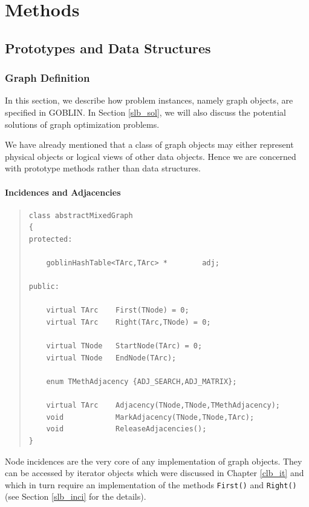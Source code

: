 \documentclass[a4paper,11pt,twoside]{book}
\begin{document}
\part{Methods}
\thispagestyle{empty}
\begin{multicols}{2}

\chapter{Prototypes and Data Structures}
\thispagestyle{fancy}
\label{clb_proto}

\section{Graph Definition}
\label{slb_definition}
In this section, we describe how problem instances, namely graph objects,
are specified in GOBLIN. In Section \ref{slb_sol}, we will also discuss the
potential solutions of graph optimization problems.

We have already mentioned that a class of graph objects may either represent
physical objects or logical views of other data objects. Hence we are concerned
with prototype methods rather than data structures.


\subsection{Incidences and Adjacencies}
\methods
\begin{quote}
\begin{verbatim}
class abstractMixedGraph
{
protected:

    goblinHashTable<TArc,TArc> *        adj;

public:

    virtual TArc    First(TNode) = 0;
    virtual TArc    Right(TArc,TNode) = 0;

    virtual TNode   StartNode(TArc) = 0;
    virtual TNode   EndNode(TArc);

    enum TMethAdjacency {ADJ_SEARCH,ADJ_MATRIX};

    virtual TArc    Adjacency(TNode,TNode,TMethAdjacency);
    void            MarkAdjacency(TNode,TNode,TArc);
    void            ReleaseAdjacencies();
}
\end{verbatim}
\end{quote}
Node incidences are the very core of any implementation of graph objects.
They can be accessed by iterator objects which were discussed in Chapter
\ref{clb_it} and which in turn require an implementation of the methods
\verb/First()/ and \verb/Right()/ (see Section \ref{slb_inci} for the details).


\end{multicols}
\end{document}
